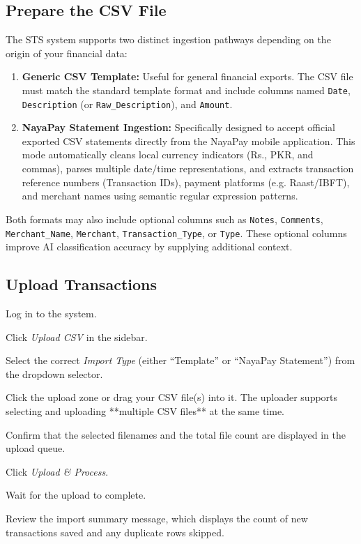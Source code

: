 \subsection{Prepare the CSV File}
The STS system supports two distinct ingestion pathways depending on the origin of your financial data:
\begin{enumerate}
	\item \textbf{Generic CSV Template:} Useful for general financial exports. The CSV file must match the standard template format and include columns named \texttt{Date}, \texttt{Description} (or \texttt{Raw\_Description}), and \texttt{Amount}.
	\item \textbf{NayaPay Statement Ingestion:} Specifically designed to accept official exported CSV statements directly from the NayaPay mobile application. This mode automatically cleans local currency indicators (Rs., PKR, and commas), parses multiple date/time representations, and extracts transaction reference numbers (Transaction IDs), payment platforms (e.g. Raast/IBFT), and merchant names using semantic regular expression patterns.
\end{enumerate}

Both formats may also include optional columns such as \texttt{Notes}, \texttt{Comments}, \texttt{Merchant\_Name}, \texttt{Merchant}, \texttt{Transaction\_Type}, or \texttt{Type}. These optional columns improve AI classification accuracy by supplying additional context.

\subsection{Upload Transactions}
\begin{normalsteps}
	\item Log in to the system.
	\item Click \textit{Upload CSV} in the sidebar.
	\item Select the correct \textit{Import Type} (either ``Template'' or ``NayaPay Statement'') from the dropdown selector.
	\item Click the upload zone or drag your CSV file(s) into it. The uploader supports selecting and uploading **multiple CSV files** at the same time.
	\item Confirm that the selected filenames and the total file count are displayed in the upload queue.
	\item Click \textit{Upload \& Process}.
	\item Wait for the upload to complete.
	\item Review the import summary message, which displays the count of new transactions saved and any duplicate rows skipped.
\end{normalsteps}

